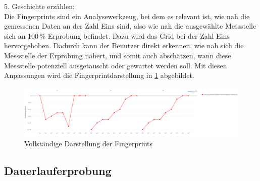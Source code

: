 5. Geschichte erzählen:\\
Die Fingerprints sind ein Analysewerkzeug, bei dem es relevant ist, wie nah die gemessenen Daten an der Zahl Eins sind, also wie nah die ausgewählte Messstelle sich an 100\,\% Erprobung befindet. Dazu wird das Grid bei der Zahl Eins hervorgehoben. Dadurch kann der Benutzer direkt erkennen, wie nah sich die Messstelle der Erprobung nähert, und somit auch abschätzen, wann diese Messstelle potenziell ausgetauscht oder gewartet werden soll. Mit diesen Anpassungen wird die Fingerprintdarstellung in \ref{fig:fingerprints_finished} abgebildet.

\begin{figure}[!h]
    \centering
    \includegraphics[width=1\linewidth]{gfx/fingerprints_finished.png}
    \caption{Vollständige Darstellung der Fingerprints}
    \label{fig:fingerprints_finished}
\end{figure}
\subsection{Dauerlauferprobung}

